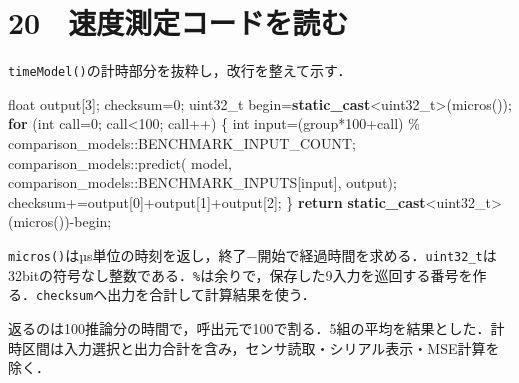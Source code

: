 \documentclass[
  14pt,
  a5paper,
]{extarticle}
\newenvironment{Shaded}{}{}
\newcommand{\ControlFlowTok}[1]{\textcolor[rgb]{0.00,0.44,0.13}{\textbf{#1}}}
\newcommand{\DataTypeTok}[1]{\textcolor[rgb]{0.56,0.13,0.00}{#1}}
\newcommand{\DecValTok}[1]{\textcolor[rgb]{0.25,0.63,0.44}{#1}}
\newcommand{\KeywordTok}[1]{\textcolor[rgb]{0.00,0.44,0.13}{\textbf{#1}}}
\newcommand{\NormalTok}[1]{#1}
\newcommand{\OperatorTok}[1]{\textcolor[rgb]{0.40,0.40,0.40}{#1}}
\begin{document}
\newpage

\section{20　速度測定コードを読む}\label{ux901fux5ea6ux6e2cux5b9aux30b3ux30fcux30c9ux3092ux8aadux3080}

\texttt{timeModel()}の計時部分を抜粋し，改行を整えて示す．

\begin{Shaded}
\begin{Highlighting}[]
\DataTypeTok{float}\NormalTok{ output}\OperatorTok{[}\DecValTok{3}\OperatorTok{];}\NormalTok{ checksum}\OperatorTok{=}\DecValTok{0}\OperatorTok{;}
\DataTypeTok{uint32\_t}\NormalTok{ begin}\OperatorTok{=}\KeywordTok{static\_cast}\OperatorTok{\textless{}}\DataTypeTok{uint32\_t}\OperatorTok{\textgreater{}(}\NormalTok{micros}\OperatorTok{());}
\ControlFlowTok{for} \OperatorTok{(}\DataTypeTok{int}\NormalTok{ call}\OperatorTok{=}\DecValTok{0}\OperatorTok{;}\NormalTok{ call}\OperatorTok{\textless{}}\DecValTok{100}\OperatorTok{;}\NormalTok{ call}\OperatorTok{++)} \OperatorTok{\{}
  \DataTypeTok{int}\NormalTok{ input}\OperatorTok{=(}\NormalTok{group}\OperatorTok{*}\DecValTok{100}\OperatorTok{+}\NormalTok{call}\OperatorTok{)}
    \OperatorTok{\%}\NormalTok{ comparison\_models}\OperatorTok{::}\NormalTok{BENCHMARK\_INPUT\_COUNT}\OperatorTok{;}
\NormalTok{  comparison\_models}\OperatorTok{::}\NormalTok{predict}\OperatorTok{(}
\NormalTok{    model}\OperatorTok{,}
\NormalTok{    comparison\_models}\OperatorTok{::}\NormalTok{BENCHMARK\_INPUTS}\OperatorTok{[}\NormalTok{input}\OperatorTok{],}
\NormalTok{    output}\OperatorTok{);}
\NormalTok{  checksum}\OperatorTok{+=}\NormalTok{output}\OperatorTok{[}\DecValTok{0}\OperatorTok{]+}\NormalTok{output}\OperatorTok{[}\DecValTok{1}\OperatorTok{]+}\NormalTok{output}\OperatorTok{[}\DecValTok{2}\OperatorTok{];}
\OperatorTok{\}}
\ControlFlowTok{return} \KeywordTok{static\_cast}\OperatorTok{\textless{}}\DataTypeTok{uint32\_t}\OperatorTok{\textgreater{}(}\NormalTok{micros}\OperatorTok{()){-}}\NormalTok{begin}\OperatorTok{;}
\end{Highlighting}
\end{Shaded}

\texttt{micros()}はµs単位の時刻を返し，終了−開始で経過時間を求める．\texttt{uint32\_t}は32bitの符号なし整数である．\texttt{\%}は余りで，保存した9入力を巡回する番号を作る．\texttt{checksum}へ出力を合計して計算結果を使う．

返るのは100推論分の時間で，呼出元で100で割る．5組の平均を結果とした．計時区間は入力選択と出力合計を含み，センサ読取・シリアル表示・MSE計算を除く．
\end{document}

